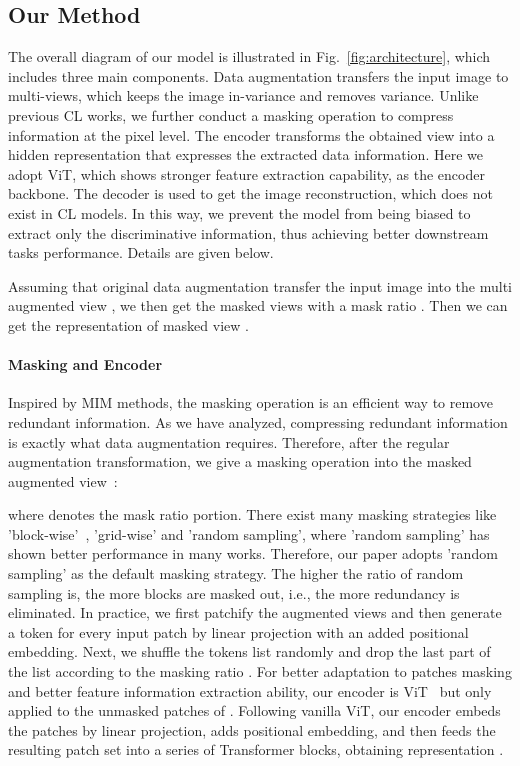 \documentclass[10pt,twocolumn,letterpaper]{article}
\begin{document}
\subsection{Our Method}
The overall diagram of our model is illustrated in Fig.~\ref{fig:architecture}, which includes three main components. Data augmentation transfers the input image to multi-views, which keeps the image in-variance and removes variance. Unlike previous CL works, we further conduct a masking operation to compress information at the pixel level. The encoder transforms the obtained view into a hidden representation that expresses the extracted data information. Here we adopt ViT, which shows stronger feature extraction capability, as the encoder backbone. The decoder is used to get the image reconstruction, which does not exist in CL models. In this way, we prevent the model from being biased to extract only the discriminative information, thus achieving better downstream tasks performance. Details are given below.


Assuming that original data augmentation transfer the input image  into the multi augmented view , we then get the masked views  with a mask ratio . Then we can get the representation  of masked view .
\paragraph{Masking and Encoder}
Inspired by MIM methods, the masking operation is an efficient way to remove redundant information. As we have analyzed, compressing redundant information is exactly what data augmentation requires. Therefore, after the regular augmentation transformation, we give a masking operation  into the masked augmented view~:


where  denotes the mask ratio portion. There exist many masking strategies like 'block-wise'~\cite{bao2021beit}, 'grid-wise' and 'random sampling', where 'random sampling' has shown better performance in many works. Therefore, our paper adopts 'random sampling' as the default masking strategy. The higher the ratio of random sampling is, the more blocks are masked out, i.e., the more redundancy is eliminated. In practice, we first patchify the augmented views  and then generate a token for every input patch by linear projection with an added positional embedding. Next, we shuffle the tokens list randomly and drop the last part of the list according to the masking ratio .
For better adaptation to patches masking and better feature information extraction ability, our encoder is ViT~\cite{dosovitskiy2020image} but only applied to the unmasked patches of . Following vanilla ViT, our encoder embeds the patches by linear projection, adds positional embedding, and then feeds the resulting patch set into a series of Transformer blocks, obtaining representation .
\end{document}

